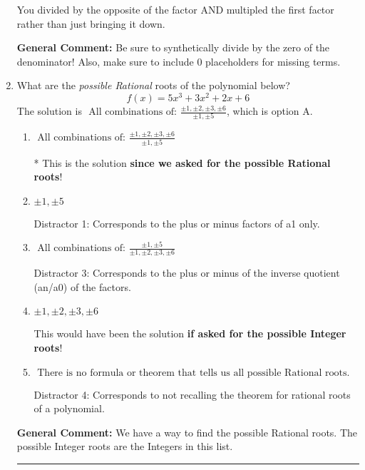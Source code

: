 \documentclass{extbook}[14pt]
\newcommand{\litem}[1]{\item #1

\rule{\textwidth}{0.4pt}}
\begin{document}
\begin{enumerate}
{\begin{enumerate}[label=\Alph*.]
 You divided by the opposite of the factor AND multipled the first factor rather than just bringing it down.
\end{enumerate}

\textbf{General Comment:} Be sure to synthetically divide by the zero of the denominator! Also, make sure to include 0 placeholders for missing terms.
}
\litem{
What are the \textit{possible Rational} roots of the polynomial below?
\[ f(x) = 5x^{3} +3 x^{2} +2 x + 6 \]The solution is \( \text{ All combinations of: }\frac{\pm 1,\pm 2,\pm 3,\pm 6}{\pm 1,\pm 5} \), which is option A.\begin{enumerate}[label=\Alph*.]
\item \( \text{ All combinations of: }\frac{\pm 1,\pm 2,\pm 3,\pm 6}{\pm 1,\pm 5} \)

* This is the solution \textbf{since we asked for the possible Rational roots}!
\item \( \pm 1,\pm 5 \)

 Distractor 1: Corresponds to the plus or minus factors of a1 only.
\item \( \text{ All combinations of: }\frac{\pm 1,\pm 5}{\pm 1,\pm 2,\pm 3,\pm 6} \)

 Distractor 3: Corresponds to the plus or minus of the inverse quotient (an/a0) of the factors. 
\item \( \pm 1,\pm 2,\pm 3,\pm 6 \)

This would have been the solution \textbf{if asked for the possible Integer roots}!
\item \( \text{ There is no formula or theorem that tells us all possible Rational roots.} \)

 Distractor 4: Corresponds to not recalling the theorem for rational roots of a polynomial.
\end{enumerate}

\textbf{General Comment:} We have a way to find the possible Rational roots. The possible Integer roots are the Integers in this list.
}
\end{enumerate}
\end{document}
